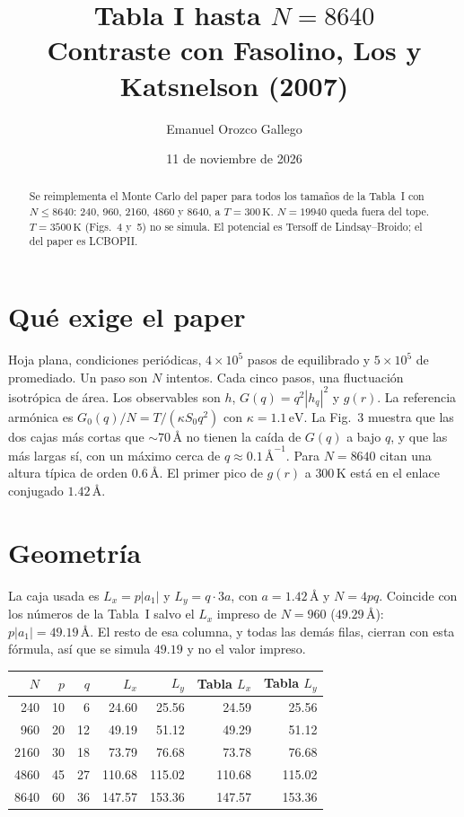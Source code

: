 \documentclass[11pt,a4paper]{article}
\title{Tabla I hasta $N=8640$\\[0.3em]
\large Contraste con Fasolino, Los y Katsnelson (2007)}
\author{Emanuel Orozco Gallego}
\date{11 de noviembre de 2026}
\begin{document}
\maketitle
\begin{abstract}
Se reimplementa el Monte Carlo del paper para todos los tamaños de la Tabla~I con $N\le 8640$: 240, 960, 2160, 4860 y 8640, a $T=300\,\mathrm{K}$. $N=19940$ queda fuera del tope. $T=3500\,\mathrm{K}$ (Figs.~4 y~5) no se simula. El potencial es Tersoff de Lindsay--Broido; el del paper es LCBOPII.
\end{abstract}

\section{Qué exige el paper}
Hoja plana, condiciones periódicas, $4\times 10^5$ pasos de equilibrado y $5\times 10^5$ de promediado. Un paso son $N$ intentos. Cada cinco pasos, una fluctuación isotrópica de área. Los observables son $h$, $G(q)=q^2|h_q|^2$ y $g(r)$. La referencia armónica es $G_0(q)/N=T/(\kappa S_0 q^2)$ con $\kappa=1.1\,\mathrm{eV}$. La Fig.~3 muestra que las dos cajas más cortas que $\sim 70\,\text{\AA}$ no tienen la caída de $G(q)$ a bajo $q$, y que las más largas sí, con un máximo cerca de $q\approx 0.1\,\text{\AA}^{-1}$. Para $N=8640$ citan una altura típica de orden $0.6\,\text{\AA}$. El primer pico de $g(r)$ a $300\,\mathrm{K}$ está en el enlace conjugado $1.42\,\text{\AA}$.

\section{Geometría}
La caja usada es $L_x=p|a_1|$ y $L_y=q\cdot 3a$, con $a=1.42\,\text{\AA}$ y $N=4pq$. Coincide con los números de la Tabla~I salvo el $L_x$ impreso de $N=960$ ($49.29\,\text{\AA}$): $p|a_1|=49.19\,\text{\AA}$. El resto de esa columna, y todas las demás filas, cierran con esta fórmula, así que se simula $49.19$ y no el valor impreso.

\begin{center}
\begin{tabular}{rrrrrrr}
\toprule
$N$ & $p$ & $q$ & $L_x$ & $L_y$ & Tabla $L_x$ & Tabla $L_y$ \\
\midrule
240 & 10 & 6 & 24.60 & 25.56 & 24.59 & 25.56 \\
960 & 20 & 12 & 49.19 & 51.12 & 49.29 & 51.12 \\
2160 & 30 & 18 & 73.79 & 76.68 & 73.78 & 76.68 \\
4860 & 45 & 27 & 110.68 & 115.02 & 110.68 & 115.02 \\
8640 & 60 & 36 & 147.57 & 153.36 & 147.57 & 153.36 \\
\bottomrule
\end{tabular}
\end{center}
\end{document}
